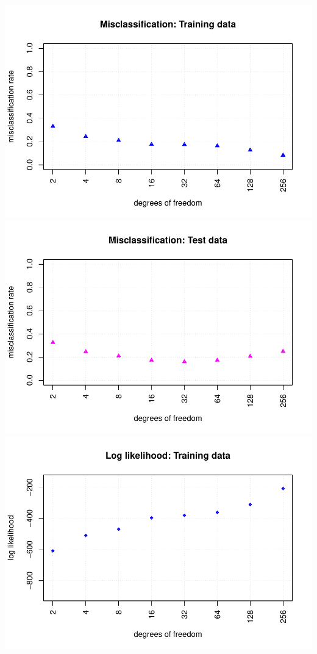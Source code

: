 \documentclass[
]{article}
\begin{document}
\includegraphics{A2_files/figure-latex/unnamed-chunk-25-1.pdf}
\includegraphics{A2_files/figure-latex/unnamed-chunk-25-2.pdf}
\includegraphics{A2_files/figure-latex/unnamed-chunk-25-3.pdf}
\end{document}

